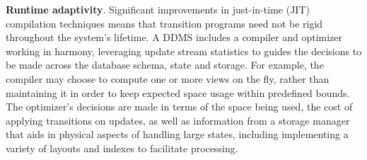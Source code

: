 {\bf Runtime adaptivity}\/.
Significant improvements in just-in-time (JIT) compilation techniques means that
transition programs need not be rigid throughout the system's lifetime. A DDMS
includes a compiler and optimizer working in harmony, leveraging update stream
statistics to guides the decisions to be made across the database schema, state
and storage. For example, the compiler may choose to compute one or more views
on the fly, rather than maintaining it in order to keep expected space usage
within predefined bounds. The optimizer's decisions are made in terms of the
space being used, the cost of applying transitions on updates, as well as
information from a storage manager that aids in physical aspects of handling
large states, including implementing a variety of layouts and indexes to
facilitate processing.










